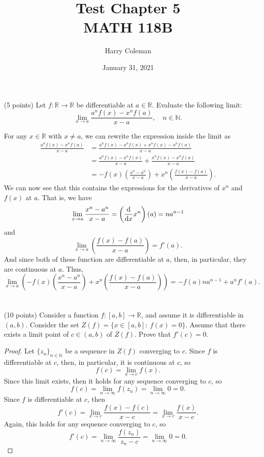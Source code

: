 \documentclass[12pt]{article}
\title{Test Chapter 5\\
    \large MATH 118B
}
\author{Harry Coleman}
\date{January 31, 2021}
\newenvironment{problem}
    {\begin{lrbox}{\mybox}\begin{minipage}{0.98\textwidth}}
    {\end{minipage}\end{lrbox}\begin{center}\framebox[\textwidth]{\usebox{\mybox}}\end{center}}
\theoremstyle{definition}
\newcommand{\N}{\mathbb{N}}
\newcommand{\R}{\mathbb{R}}
\newcommand{\pfrac}[2]{\left(\frac{#1}{#2}\right)}
\begin{document}
\maketitle

\section{}
\begin{problem}
    (5 points) Let $f:\R \to \R$ be differentiable at $a\in\R$. Evaluate the following limit:
    \begin{equation}
    \lim_{x\to a} \frac{a^nf(x)-x^nf(a)}{x-a},\quad n\in \N.
    \end{equation}
\end{problem}

For any $x \in \R$ with $x \ne a$, we can rewrite the expression inside the limit as
\begin{align*}
    \frac{a^nf(x)-x^nf(a)}{x-a}
        &= \frac{a^nf(x) - x^nf(x) + x^nf(x) - x^nf(a)}{x-a} \\
        &= \frac{a^nf(x) - x^nf(x)}{x-a} + \frac{x^nf(x) - x^nf(a)}{x-a} \\
        &= -f(x) \pfrac{x^n - a^n}{x-a} + x^n \pfrac{f(x) - f(a)}{x-a}.
\end{align*}
We can now see that this contains the expressions for the derivatives of $x^n$ and $f(x)$ at $a$. That is, we have
\[
    \lim_{x\to a} \frac{x^n - a^n}{x-a} = \left(\dv{x}x^n\right)(a) = na^{n-1}
\]
and
\[
    \lim_{x\to a} \pfrac{f(x) - f(a)}{x-a} = f'(a).
\]
And since both of these function are differentiable at $a$, then, in particular, they are continuous at $a$. Thus,
\[
    \lim_{x\to a} \left(-f(x) \pfrac{x^n - a^n}{x-a} + x^n \pfrac{f(x) - f(a)}{x-a}\right)
        = -f(a)na^{n-1} + a^nf'(a).
\]

\newpage
\section{}
\begin{problem}
    (10 points) Consider a function $f:[a,b] \to \mathbb{R}$, and assume it is differentiable in $(a,b)$. Consider the set $Z(f) = \{ x \in [a,b]:\ f(x) = 0\}$. Assume that there exists a limit point of $c\in (a,b)$ of  $Z(f)$. Prove that $f'(c) = 0$. 
\end{problem}

\begin{proof}
    Let $\{z_n\}_{n\in\N}$ be a sequence in $Z(f)$ converging to $c$. Since $f$ is differentiable at $c$, then, in particular, it is continuous at $c$, so
    \[
        f(c) = \lim_{x \to c} f(x).
    \]
    Since this limit exists, then it holds for any sequence converging to $c$, so
    \[
        f(c) = \lim_{n \to \infty} f(z_n) = \lim_{n \to \infty} 0 = 0.
    \]
    Since $f$ is differentiable at $c$, then
    \[
        f'(c) = \lim_{x \to c} \frac{f(x) - f(c)}{x - c} = \lim_{x \to c} \frac{f(x)}{x - c}.
    \]
    Again, this holds for any sequence converging to $c$, so
    \[
        f'(c) = \lim_{n \to \infty} \frac{f(z_n)}{z_n - c} = \lim_{n \to \infty} 0 = 0.
    \]
    
\end{proof}
\end{document}
